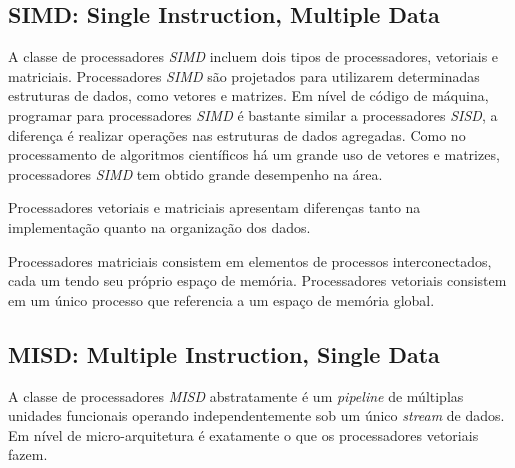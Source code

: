 \subsection{SIMD: Single Instruction, Multiple Data}

A classe de processadores \textit{SIMD} incluem dois tipos de
processadores, vetoriais e matriciais.
Processadores \textit{SIMD} são projetados para utilizarem determinadas
estruturas de dados, como vetores e matrizes. 
Em nível de código de máquina, programar para processadores \textit{SIMD} é 
bastante similar a processadores \textit{SISD}, a diferença é realizar operações
nas estruturas de dados agregadas. Como no processamento de algoritmos 
científicos há um grande uso de vetores e matrizes, processadores \textit{SIMD}
tem obtido grande desempenho na área.

Processadores vetoriais e matriciais apresentam diferenças tanto na 
implementação quanto na organização dos dados.

Processadores matriciais consistem em elementos de processos interconectados,
cada um tendo seu próprio espaço de memória. Processadores vetoriais consistem
em um único processo que referencia a um espaço de memória global.





\subsection{MISD: Multiple Instruction, Single Data}

A classe de processadores \textit{MISD} abstratamente é um
\textit{pipeline} de múltiplas unidades funcionais operando independentemente
sob um único \textit{stream} de dados. Em nível de micro-arquitetura é
exatamente o que os processadores vetoriais fazem.

